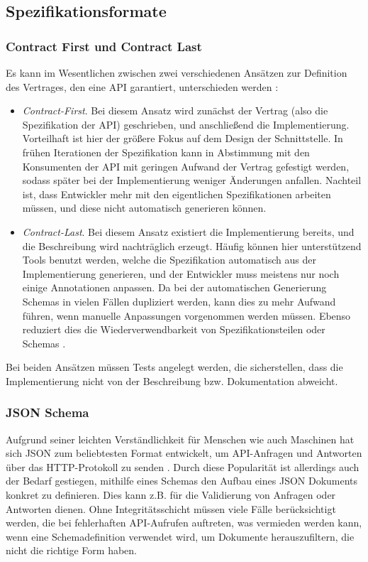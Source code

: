 \subsection{Spezifikationsformate}

\subsubsection{Contract First und Contract Last}

Es kann im Wesentlichen zwischen zwei verschiedenen Ansätzen zur Definition des Vertrages, den eine API garantiert, unterschieden werden \parencite[272]{spichale2017api}:

\begin{itemize}
	\item \emph{Contract-First}. Bei diesem Ansatz wird zunächst der Vertrag (also die Spezifikation der API) geschrieben, und anschließend die Implementierung. Vorteilhaft ist hier der größere Fokus auf dem Design der Schnittstelle. In frühen Iterationen der Spezifikation kann in Abstimmung mit den Konsumenten der API mit geringen Aufwand der Vertrag gefestigt werden, sodass später bei der Implementierung weniger Änderungen anfallen. Nachteil ist, dass Entwickler mehr mit den eigentlichen Spezifikationen arbeiten müssen, und diese nicht automatisch generieren können.
	\item \emph{Contract-Last}. Bei diesem Ansatz existiert die Implementierung bereits, und die Beschreibung wird nachträglich erzeugt. Häufig können hier unterstützend Tools benutzt werden, welche die Spezifikation automatisch aus der Implementierung generieren, und der Entwickler muss meistens nur noch einige Annotationen anpassen. Da bei der automatischen Generierung Schemas in vielen Fällen dupliziert werden, kann dies zu mehr Aufwand führen, wenn manuelle Anpassungen vorgenommen werden müssen. Ebenso reduziert dies die Wiederverwendbarkeit von Spezifikationsteilen oder Schemas \parencite[1]{zhong2009contract}.
\end{itemize}

Bei beiden Ansätzen müssen Tests angelegt werden, die sicherstellen, dass die Implementierung nicht von der Beschreibung bzw. Dokumentation abweicht.

\subsubsection{JSON Schema}

Aufgrund seiner leichten Verständlichkeit für Menschen wie auch Maschinen hat sich JSON zum beliebtesten Format entwickelt, um API-Anfragen und Antworten über das HTTP-Protokoll zu senden \parencite[263]{pezoa2016foundations}. Durch diese Popularität ist allerdings auch der Bedarf gestiegen, mithilfe eines Schemas den Aufbau eines JSON Dokuments konkret zu definieren. Dies kann z.B. für die Validierung von Anfragen oder Antworten dienen. Ohne Integritätsschicht müssen viele Fälle berücksichtigt werden, die bei fehlerhaften API-Aufrufen auftreten, was vermieden werden kann, wenn eine Schemadefinition verwendet wird, um Dokumente herauszufiltern, die nicht die richtige Form haben. \\

